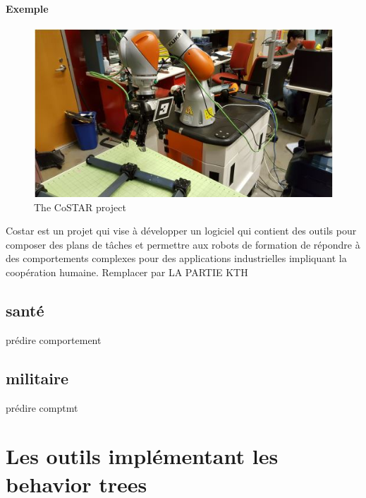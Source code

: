 \documentclass[titlepage]{article}
\begin{document}
		\paragraph{Exemple}
		\begin{figure}[h!]
			\includegraphics[width=\linewidth]{img/robotind.JPG}
			\caption{The CoSTAR project}
			\label{fig:civil}
		\end{figure}
		Costar est un projet qui vise à développer un logiciel qui contient des outils pour composer des plans de tâches et permettre aux robots de formation de répondre à des comportements complexes pour des applications industrielles impliquant la coopération humaine.
		Remplacer par LA PARTIE KTH
		
		\subsection{santé}
	prédire comportement
	
		\subsection{militaire}
	prédire comptmt
	
	\clearpage
	\section{Les outils implémentant les behavior trees}
\end{document}

